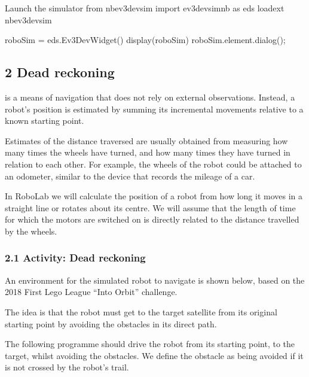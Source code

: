 \documentclass[letterpaper,10pt,english]{sphinxmanual}
\let\sphinxpxdimen\pdfpxdimen\else\newdimen\sphinxpxdimen
\begin{document}
{{\begin{sphinxVerbatim}[commandchars=\\\{\}]
\PYGZsh{}Launch the simulator
from nbev3devsim import ev3devsim\PYGZus{}nb as eds
\PYGZpc{}load\PYGZus{}ext nbev3devsim

roboSim = eds.Ev3DevWidget()
display(roboSim)
roboSim.element.dialog();
\end{sphinxVerbatim}
}


\subsection{2 Dead reckoning}
\label{\detokenize{content/03_Robot_Lab/Section_00_02:2-Dead-reckoning}}\label{\detokenize{content/03_Robot_Lab/Section_00_02::doc}}
 is a means of navigation that does not rely on external observations. Instead, a robot’s position is estimated by summing its incremental movements relative to a known starting point.

Estimates of the distance traversed are usually obtained from measuring how many times the wheels have turned, and how many times they have turned in relation to each other. For example, the wheels of the robot could be attached to an odometer, similar to the device that records the mileage of a car.

In RoboLab we will calculate the position of a robot from how long it moves in a straight line or rotates about its centre. We will assume that the length of time for which the motors are switched on is directly related to the distance travelled by the wheels.


\subsubsection{2.1 Activity: Dead reckoning}
\label{\detokenize{content/03_Robot_Lab/Section_00_02:2.1-Activity:-Dead-reckoning}}
An environment for the simulated robot to navigate is shown below, based on the 2018 First Lego League “Into Orbit” challenge.

The idea is that the robot must get to the target satellite from its original starting point by avoiding the obstacles in its direct path.

\noindent\sphinxincludegraphics[width=1714\sphinxpxdimen,height=1020\sphinxpxdimen]{{Section_00_02_-_Jupyter_Notebook}.png}

The following programme should drive the robot from its starting point, to the target, whilst avoiding the obstacles. We define the obstacle as being avoided if it is not crossed by the robot’s  trail.

}
\end{document}
